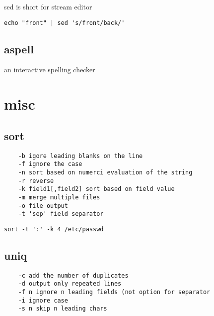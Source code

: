 sed is short for stream editor

\verb+echo "front" | sed 's/front/back/'+

\subsection{aspell}
an interactive spelling checker
\section{misc}
\subsection{sort}

\begin{verbatim}
    -b igore leading blanks on the line
    -f ignore the case
    -n sort based on numerci evaluation of the string
    -r reverse
    -k field1[,field2] sort based on field value
    -m merge multiple files
    -o file output
    -t 'sep' field separator
\end{verbatim}

\verb+sort -t ':' -k 4 /etc/passwd+

\subsection{uniq}

\begin{verbatim}
    -c add the number of duplicates
    -d output only repeated lines
    -f n ignore n leading fields (not option for separator
    -i ignore case
    -s n skip n leading chars
\end{verbatim}


